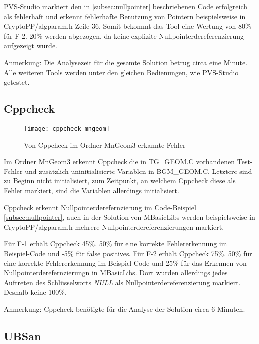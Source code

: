 PVS-Studio markiert den in \ref{subsec:nullpointer} beschriebenen Code erfolgreich als fehlerhaft und erkennt fehlerhafte Benutzung von Pointern beispielsweise in
\glqq{}CryptoPP/algparam.h\grqq{} Zeile 36. Somit bekommt das Tool eine Wertung von 80\% für F-2. 20\% werden abgezogen, da keine explizite Nullpointerdereferenzierung
aufgezeigt wurde.

Anmerkung: Die Analysezeit für die gesamte Solution betrug circa eine Minute. \newline
Alle weiteren Tools werden unter den gleichen Bedienungen, wie PVS-Studio getestet.

\subsection{Cppcheck}

\begin{figure}[htpb]
  \centering
  \texttt{[image: cppcheck-mngeom]}
  \caption{Von Cppcheck im Ordner MnGeom3 erkannte Fehler}
  \label{img:cppcheck-mngeom}
\end{figure}

Im Ordner \glqq{}MnGeom3\grqq{} erkennt Cppcheck die in \glqq{}TG\_GEOM.C\grqq{} vorhandenen Test-Fehler und zusätzlich uninitialisierte Variablen in \glqq{}BGM\_GEOM.C\grqq{}. Letztere
sind zu Beginn nicht initialisiert, zum Zeitpunkt, an welchem Cppcheck diese als Fehler markiert, sind die Variablen allerdings initialisiert. \newline

Cppcheck erkennt Nullpointerderefernzierung im Code-Beispiel \ref{subsec:nullpointer}, auch in der Solution von MBasicLibs werden beispielsweise in \glqq{}CryptoPP/algparam.h\grqq{}
mehrere Nullpointerdereferenzierungen markiert.

Für F-1 erhält Cppcheck 45\%. 50\% für eine korrekte Fehlererkennung im Beispiel-Code und -5\% für false positives. \newline
Für F-2 erhält Cppcheck 75\%. 50\% für eine korrekte Fehlererkennung im Beispiel-Code und 25\% für das Erkennen von Nullpointerderefernzierungn in MBasicLibs. Dort wurden allerdings
jedes Auftreten des Schlüsselworts \textit{NULL} als Nullpointerdereferenzierung markiert. Deshalb keine 100\%.

Anmerkung: Cppcheck benötigte für die Analyse der Solution circa 6 Minuten.

\subsection{UBSan}

